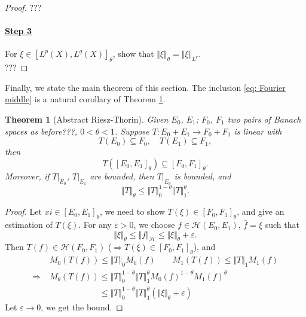 \documentclass[reqno,UTF8]{amsart}
\numberwithin{equation}{section}
\theoremstyle{plain}
\newtheorem{theorem}{Theorem}[section]
\numberwithin{equation}{section}
\theoremstyle{remark}
\newcommand{\norm}[1]{\Vert{#1}\Vert}
\begin{document}
\begin{proof}
???
\paragraph*{\underline{\textbf{Step 3}}}For $\xi \in \left[ L^p(X), L^q(X) \right]_{\theta}$, show that $\norm{\xi}_{\theta}=\norm{\xi}_{L^r}$.\\[-3mm]

???
\end{proof}

Finally, we state the main theorem of this section. The inclusion \ref{eq: Fourier middle} is a natural corollary of Theorem \ref{thm:interpolation_operator}.
\begin{theorem}[Abstract Riesz-Thorin]\label{thm:interpolation_operator}
Given $E_0$, $E_1$; $F_0$, $F_1$ two pairs of Banach spaces as before???, $0 < \theta < 1$. Suppose $T: E_0 +E_1 \longrightarrow F_0 + F_1$ is linear with
$$T(E_0) \subseteq F_0, \quad T(E_1) \subseteq F_1,$$
then
$$T([E_0,E_1]_{\theta}) \subseteq [F_0,F_1]_{\theta}.$$
Moreover, if $T|_{E_0}$, $T|_{E_1}$ are bounded, then $T|_{E_{\theta}}$ is bounded, and 
$$\norm{T}_{\theta} \le \norm{T}_0^{1-\theta} \norm{T}_1^{\theta}.$$
\end{theorem}
\begin{proof}
Let $xi \in [E_0,E_1]_{\theta}$, we need to show $T(\xi) \in [F_0,F_1]_{\theta}$, and give an estimation of $T(\xi)$. For any $\varepsilon > 0$, we choose $f \in \mathcal{H}(E_0,E_1)$, $\bar{f}=\xi$ such that 
$$\norm{\xi}_{\theta} \le \norm{f}_{\mathcal{H }} \le \norm{\xi}_{\theta} + \varepsilon.$$
Then $T(f) \in \mathcal{H}(F_0,F_1)$ ($\Rightarrow T(\xi) \in [F_0,F_1]_{\theta}$), and 
\begin{equation*}
\begin{aligned}
  \;& M_0(T(f)) \le \norm{T}_0 M_0(f) \qquad M_1(T(f)) \le \norm{T}_1 M_1(f)\\ 
  \Longrightarrow\;& M_{\theta}(T(f)) \le \norm{T}_0^{1-\theta} \norm{T}_1^{\theta} M_0(f)^{1-\theta} M_1(f)^{\theta} \\
   \;& \phantom{M_{\theta}(T(f))} \le \norm{T}_0^{1-\theta} \norm{T}_1^{\theta} \left( \norm{\xi}_{\theta} +\varepsilon \right)
\end{aligned}
\end{equation*}
Let $\varepsilon \rightarrow 0$, we get the bound.
\end{proof}


\end{document}
